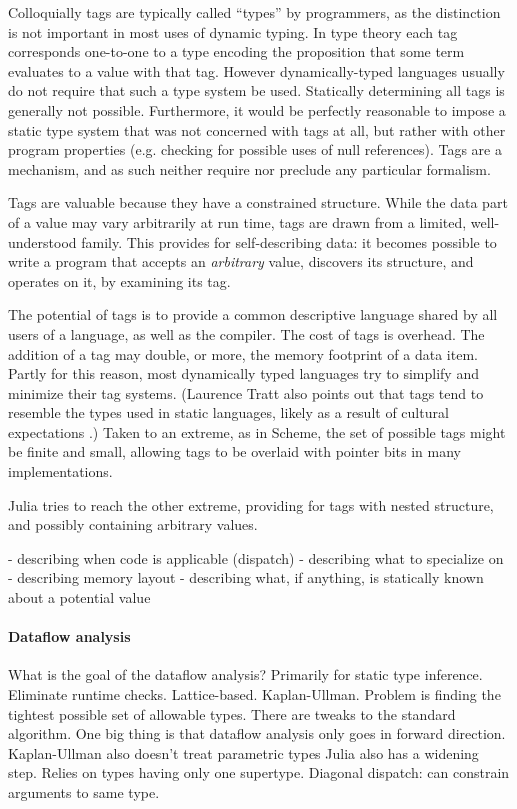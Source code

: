 Colloquially tags are typically called ``types'' by programmers, as the distinction
is not important in most uses of dynamic typing. In type theory each tag corresponds
one-to-one to a type encoding the proposition that some term evaluates to a value
with that tag. However dynamically-typed languages usually do not require that such
a type system be used. Statically determining all tags is generally not possible.
Furthermore, it would be perfectly reasonable to impose a static type system that
was not concerned with tags at all, but rather with other program properties
(e.g. checking for possible uses of null references). Tags are a mechanism, and as
such neither require nor preclude any particular formalism.

Tags are valuable because they have a constrained structure. While the data
part of a value may vary arbitrarily at run time, tags are drawn from a limited,
well-understood family. This provides for self-describing data: it becomes possible
to write a program that accepts an \emph{arbitrary} value, discovers its structure,
and operates on it, by examining its tag.

The potential of tags is to provide a common descriptive language shared by all users
of a language, as well as the compiler. The cost of tags is overhead. The addition of
a tag may double, or more, the memory footprint of a data item. Partly for this reason,
most dynamically typed languages try to simplify and minimize their tag systems.
(Laurence Tratt also points out that tags tend to resemble the types used in static
languages, likely as a result of cultural expectations \cite{}.) Taken to an extreme,
as in Scheme, the set of possible tags might be finite and small, allowing tags to be
overlaid with pointer bits in many implementations.

Julia tries to reach the other extreme, providing for tags with nested structure, and
possibly containing arbitrary values.

- describing when code is applicable (dispatch)
- describing what to specialize on
- describing memory layout
- describing what, if anything, is statically known about a potential value

\paragraph{Dataflow analysis}

What is the goal of the dataflow analysis? Primarily for static type inference. Eliminate runtime checks. Lattice-based. Kaplan-Ullman.
Problem is finding the tightest possible set of allowable types.
There are tweaks to the standard algorithm. One big thing is that dataflow analysis only goes in forward direction.
Kaplan-Ullman also doesn’t treat parametric types
Julia also has a widening step.
Relies on types having only one supertype.
Diagonal dispatch: can constrain arguments to same type.

